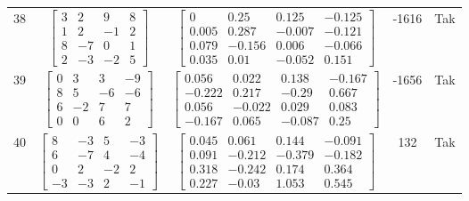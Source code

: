 \documentclass[a4paper,12pt]{article}
\begin{document}
\begin{tabular}{c c c c c}
38
&
$\begin{bmatrix} 3 & 2 & 9 & 8 \\ 1 & 2 & -1 & 2 \\ 8 & -7 & 0 & 1 \\ 2 & -3 & -2 & 5 \end{bmatrix}$
&
$\begin{bmatrix} 0 & 0.25 & 0.125 & -0.125 \\ 0.005 & 0.287 & -0.007 & -0.121 \\ 0.079 & -0.156 & 0.006 & -0.066 \\ 0.035 & 0.01 & -0.052 & 0.151 \end{bmatrix}$
&
-1616
&
Tak
\\
39
&
$\begin{bmatrix} 0 & 3 & 3 & -9 \\ 8 & 5 & -6 & -6 \\ 6 & -2 & 7 & 7 \\ 0 & 0 & 6 & 2 \end{bmatrix}$
&
$\begin{bmatrix} 0.056 & 0.022 & 0.138 & -0.167 \\ -0.222 & 0.217 & -0.29 & 0.667 \\ 0.056 & -0.022 & 0.029 & 0.083 \\ -0.167 & 0.065 & -0.087 & 0.25 \end{bmatrix}$
&
-1656
&
Tak
\\
40
&
$\begin{bmatrix} 8 & -3 & 5 & -3 \\ 6 & -7 & 4 & -4 \\ 0 & 2 & -2 & 2 \\ -3 & -3 & 2 & -1 \end{bmatrix}$
&
$\begin{bmatrix} 0.045 & 0.061 & 0.144 & -0.091 \\ 0.091 & -0.212 & -0.379 & -0.182 \\ 0.318 & -0.242 & 0.174 & 0.364 \\ 0.227 & -0.03 & 1.053 & 0.545 \end{bmatrix}$
&
132
&
Tak
\\
\end{tabular} \egroup \newpage
\end{document}
